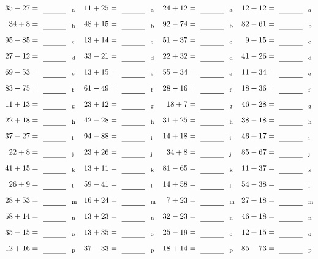 \documentclass
[
  draft    = true,
  fontsize = 11pt,
  parskip  = half-
]
{scrartcl}
\begin{document}
\clearpage
\begin{align*}
    \pline{35-27}&=\rline{a}
  & \pline{11+25}&=\rline{a}
  & \pline{24+12}&=\rline{a}
  & \pline{12+12}&=\rline{a} \\[1ex]
    \pline{34+8}&=\rline{b}
  & \pline{48+15}&=\rline{b}
  & \pline{92-74}&=\rline{b}
  & \pline{82-61}&=\rline{b} \\[1ex]
    \pline{95-85}&=\rline{c}
  & \pline{13+14}&=\rline{c}
  & \pline{51-37}&=\rline{c}
  & \pline{9+15}&=\rline{c} \\[1ex]
    \pline{27-12}&=\rline{d}
  & \pline{33-21}&=\rline{d}
  & \pline{22+32}&=\rline{d}
  & \pline{41-26}&=\rline{d} \\[1ex]
    \pline{69-53}&=\rline{e}
  & \pline{13+15}&=\rline{e}
  & \pline{55-34}&=\rline{e}
  & \pline{11+34}&=\rline{e} \\[1ex]
    \pline{83-75}&=\rline{f}
  & \pline{61-49}&=\rline{f}
  & \pline{28-16}&=\rline{f}
  & \pline{18+36}&=\rline{f} \\[1ex]
    \pline{11+13}&=\rline{g}
  & \pline{23+12}&=\rline{g}
  & \pline{18+7}&=\rline{g}
  & \pline{46-28}&=\rline{g} \\[1ex]
    \pline{22+18}&=\rline{h}
  & \pline{42-28}&=\rline{h}
  & \pline{31+25}&=\rline{h}
  & \pline{38-18}&=\rline{h} \\[1ex]
    \pline{37-27}&=\rline{i}
  & \pline{94-88}&=\rline{i}
  & \pline{14+18}&=\rline{i}
  & \pline{46+17}&=\rline{i} \\[1ex]
    \pline{22+8}&=\rline{j}
  & \pline{23+26}&=\rline{j}
  & \pline{34+8}&=\rline{j}
  & \pline{85-67}&=\rline{j} \\[1ex]
    \pline{41+15}&=\rline{k}
  & \pline{13+11}&=\rline{k}
  & \pline{81-65}&=\rline{k}
  & \pline{11+37}&=\rline{k} \\[1ex]
    \pline{26+9}&=\rline{l}
  & \pline{59-41}&=\rline{l}
  & \pline{14+58}&=\rline{l}
  & \pline{54-38}&=\rline{l} \\[1ex]
    \pline{28+53}&=\rline{m}
  & \pline{16+24}&=\rline{m}
  & \pline{7+23}&=\rline{m}
  & \pline{27+18}&=\rline{m} \\[1ex]
    \pline{58+14}&=\rline{n}
  & \pline{13+23}&=\rline{n}
  & \pline{32-23}&=\rline{n}
  & \pline{46+18}&=\rline{n} \\[1ex]
    \pline{35-15}&=\rline{o}
  & \pline{13+35}&=\rline{o}
  & \pline{25-19}&=\rline{o}
  & \pline{12+15}&=\rline{o} \\[1ex]
    \pline{12+16}&=\rline{p}
  & \pline{37-33}&=\rline{p}
  & \pline{18+14}&=\rline{p}
  & \pline{85-73}&=\rline{p}
\end{align*}
\end{document}
